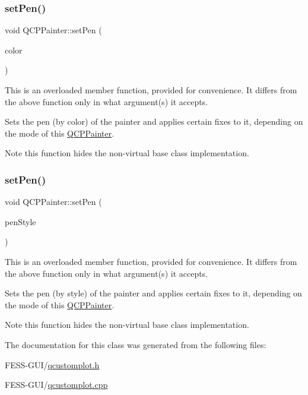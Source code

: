 \subsubsection{\texorpdfstring{set\+Pen()}{setPen()}\hspace{0.1cm}{\footnotesize\ttfamily [2/3]}}
{\footnotesize\ttfamily void Q\+C\+P\+Painter\+::set\+Pen (\begin{DoxyParamCaption}\item[{const Q\+Color \&}]{color }\end{DoxyParamCaption})}

This is an overloaded member function, provided for convenience. It differs from the above function only in what argument(s) it accepts.

Sets the pen (by color) of the painter and applies certain fixes to it, depending on the mode of this \hyperlink{class_q_c_p_painter}{Q\+C\+P\+Painter}.

\begin{DoxyNote}{Note}
this function hides the non-\/virtual base class implementation. 
\end{DoxyNote}
\hypertarget{class_q_c_p_painter_a25e76095aae41da0d08035060e5f81ca}{}\label{class_q_c_p_painter_a25e76095aae41da0d08035060e5f81ca} 
\subsubsection{\texorpdfstring{set\+Pen()}{setPen()}\hspace{0.1cm}{\footnotesize\ttfamily [3/3]}}
{\footnotesize\ttfamily void Q\+C\+P\+Painter\+::set\+Pen (\begin{DoxyParamCaption}\item[{Qt\+::\+Pen\+Style}]{pen\+Style }\end{DoxyParamCaption})}

This is an overloaded member function, provided for convenience. It differs from the above function only in what argument(s) it accepts.

Sets the pen (by style) of the painter and applies certain fixes to it, depending on the mode of this \hyperlink{class_q_c_p_painter}{Q\+C\+P\+Painter}.

\begin{DoxyNote}{Note}
this function hides the non-\/virtual base class implementation. 
\end{DoxyNote}


The documentation for this class was generated from the following files\+:\begin{DoxyCompactItemize}
\item 
F\+E\+S\+S-\/\+G\+U\+I/\hyperlink{qcustomplot_8h}{qcustomplot.\+h}\item 
F\+E\+S\+S-\/\+G\+U\+I/\hyperlink{qcustomplot_8cpp}{qcustomplot.\+cpp}\end{DoxyCompactItemize}
